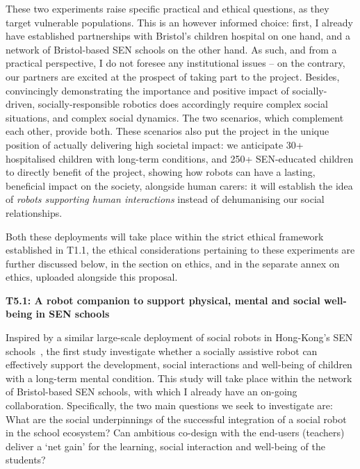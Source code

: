 These two experiments raise specific practical and ethical questions, as they
target vulnerable populations. This is an however informed choice: first, I
already have established partnerships with Bristol's children hospital on one
hand, and a network of Bristol-based SEN schools on the other hand. As such, and
from a practical perspective, I do not foresee any institutional issues -- on
the contrary, our partners are excited at the prospect of taking part to the
project. Besides, convincingly demonstrating the importance and positive impact
of socially-driven, socially-responsible robotics does accordingly require
complex social situations, and complex social dynamics. The two scenarios, which
complement each other, provide both. These scenarios also put the project in the
unique position of actually delivering high societal impact: we anticipate 30+
hospitalised children with long-term conditions, and 250+ SEN-educated children
to directly benefit of the project, showing how robots can have a lasting,
beneficial impact on the society, alongside human carers: it will establish the
idea of \emph{robots supporting human interactions} instead of dehumanising our
social relationships.

Both these deployments will take place within the strict ethical framework
established in T1.1, the ethical considerations pertaining to these experiments
are further discussed below, in the section on ethics, and in the separate annex
on ethics, uploaded alongside this proposal.



\textbf{T5.1: A robot companion to support physical, mental and social
well-being in SEN schools}

Inspired by a similar large-scale deployment of social robots in Hong-Kong's SEN
schools~\cite{robot4sen}, the first study investigate whether a socially
assistive robot can effectively support the development, social
interactions and well-being of children with a long-term mental condition. This
study will take place within the network of Bristol-based SEN schools, with
which I already have an on-going collaboration.  Specifically, the two main
questions we seek to investigate are: What are the social underpinnings of the
successful integration of a social robot in the school ecosystem? Can ambitious
co-design with the end-users (teachers) deliver a `net gain' for the learning,
social interaction and well-being of the students? 

